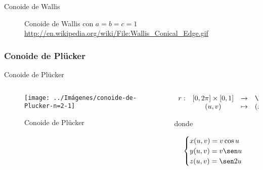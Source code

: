 \documentclass[10pt]{beamer}
\begin{document}
	\begin{frame}{Conoide de Wallis}
	\begin{figure}
		\centering
		\caption{Conoide de Wallis con $a=b=c=1$ \url{http://en.wikipedia.org/wiki/File:Wallis_Conical_Edge.gif}}
		\label{fig:conoide-de-Wallis-gif}
	\end{figure}
		
	\end{frame}
	
	\subsubsection{Conoide de Plücker}
	
	\begin{frame}{Conoide de Plücker}
		\begin{columns}[t] %
			\begin{column}{.50\textwidth}
				\begin{figure}
					\centering
					\texttt{[image: ../Imágenes/conoide-de-Plucker-n=2-1]}
					\caption{Conoide de Plücker}
					\label{fig:conoide-de-Plucker-1}
				\end{figure}
			\end{column}%
			\hfill%
			\begin{column}{.50\textwidth}
				$$\begin{array}{rcll}
				r : & [0, 2\pi] \times [0,1] & \to & \R^3\\
				& (u,v) & \mapsto & (x,y,z)
				\end{array}$$
				
				donde 
				
				$$ \begin{cases}
				x(u,v) = v \cos u \\
				y(u,v) = v \sen u \\
				z(u,v) = \sen 2u
				\end{cases} $$
			\end{column}%
		\end{columns}
	\end{frame}
	
\end{document}
